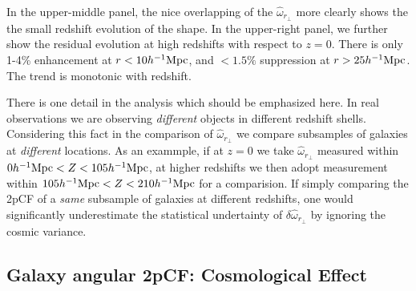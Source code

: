 \documentclass[iop]{emulateapj}
\begin{document}
In the upper-middle panel, the nice overlapping of the $\hat\omega_{r_\perp}$
more clearly shows the the small redshift evolution of the shape.
In the upper-right panel, 
we further show the residual evolution at high redshifts 
with respect to $z=0$.
There is only 1-4\% enhancement 
at $r<10h^{-1}\rm Mpc$,
and $<1.5\%$ suppression at $r>25 h^{-1}\rm Mpc$.
The trend is monotonic with redshift.

There is one detail in the analysis which should be emphasized here.
In real observations we are observing {\it different} objects in different redshift shells.
Considering this fact in the comparison of $\hat\omega_{r_\perp}$ 
we compare subsamples of galaxies at {\it different} locations.
As an exammple, if at $z=0$ we take $\hat\omega_{r_\perp}$ measured within $0h^{-1}{\rm Mpc}<Z<105 h^{-1}{\rm Mpc}$,
at higher redshifts we then adopt measurement within $105h^{-1}{\rm Mpc}<Z<210 h^{-1}{\rm Mpc}$ for a comparision.
If simply comparing the 2pCF of a {\it same} subsample of galaxies at different redshifts, 
one would significantly underestimate the statistical undertainty of $\delta \hat{\omega}_{r_\perp}$ by ignoring the cosmic variance.




\subsection{Galaxy angular 2pCF: Cosmological Effect }
\end{document}
